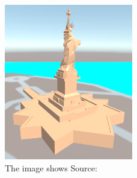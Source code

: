 \begin{figure}[H]
    \centering
    \includegraphics[width=0.5\textwidth]{00_Maps/Images/liberty.png}
    \caption{The image shows Source: }
    \label{figure:maps:GoogleMapsSDK_Liberty}
\end{figure}